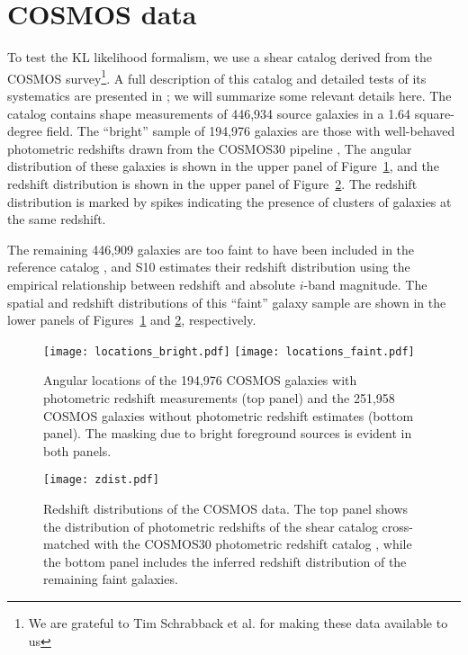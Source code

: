 \section{COSMOS data}
\label{sec:data}
To test the KL likelihood formalism, we use a shear catalog derived from the
COSMOS survey\footnote{We are grateful to Tim Schrabback et al. for making 
these data available to us}.  A full description of this catalog and detailed 
tests of its systematics are presented in
\citet[][hereafter S10]{Schrabback10}; we will summarize some relevant
details here.
The catalog contains shape measurements of 446,934 source galaxies 
in a 1.64 square-degree field.
The ``bright'' sample of 194,976 galaxies are those with well-behaved
photometric redshifts drawn from the COSMOS30 pipeline
\citep[][S10]{Hildebrandt2009},  The angular distribution of these
galaxies is shown in the upper panel of Figure~\ref{fig:COSMOS_locations},
and the redshift distribution is shown in the upper panel of
Figure~\ref{fig:COSMOS_zdist}.  The redshift distribution is marked by
spikes indicating the presence of clusters of galaxies at the same redshift.

The remaining 446,909 galaxies are too faint to have been included
in the reference catalog \citep[the COSMOS30 redshifts are limited to
$i^+ < 25$; See][]{Ilbert09}, and S10 estimates their redshift distribution
using the empirical relationship between redshift and absolute $i$-band
magnitude.
The spatial and redshift distributions of this ``faint'' galaxy
sample are shown in the lower panels of Figures~\ref{fig:COSMOS_locations}
and \ref{fig:COSMOS_zdist}, respectively.

\begin{figure}
  \centering
  \texttt{[image: locations\_bright.pdf]}
  \texttt{[image: locations\_faint.pdf]}
  \caption[Angular locations of COSMOS galaxies]
  {Angular locations of the 194,976 COSMOS galaxies with photometric
    redshift measurements (top panel)
    and the 251,958 COSMOS galaxies without photometric redshift estimates
    (bottom panel).  The masking due to bright foreground sources is evident
    in both panels.}
  \label{fig:COSMOS_locations}
\end{figure}

\begin{figure}
  \centering
  \texttt{[image: zdist.pdf]}
  \caption[Redshift distributions of the COSMOS data]
  {Redshift distributions of the COSMOS data.  The top panel shows the
    distribution of photometric redshifts of the shear catalog cross-matched
    with the COSMOS30 photometric redshift catalog \citep{Ilbert09}, while
    the bottom panel includes the inferred redshift distribution of the
    remaining faint galaxies.}
  \label{fig:COSMOS_zdist}
\end{figure}

